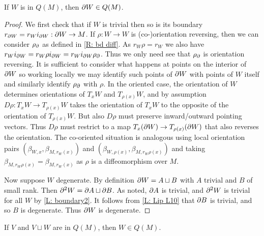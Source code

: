 \begin{lemma}\label{L: bd defined}
If $W$ is in $Q(M)$, then $\partial W \in Q(M)$.
\end{lemma}
\begin{proof}
We first check that if $W$ is trivial then so is its boundary $r_{\partial W} = r_Wi_{\partial W}:\partial W \to M$. If $\rho:W \to W$ is (co-)orientation reversing, then we can consider $\rho_\partial$ as defined in \cref{R: bd diff}. As $r_W\rho = r_W$ we also have $r_Wi_{\partial W} = r_W\rho i_{\partial W} = r_W i_{\partial W} \rho_\partial$. Thus we only need see that $\rho_\partial$ is orientation reversing. It is sufficient to consider what happens at points on the interior of $\partial W$ so working locally we may identify such points of $\partial W$ with points of $W$ itself and similarly identify $\rho_\partial$ with $\rho$. In the oriented case, the orientation of $W$ determines orientations of $T_xW$ and $T_{\rho(x)}W$, and by assumption $D\rho: T_xW \to T_{\rho(x)}W$ takes the orientation of $T_xW$ to the opposite of the orientation of $T_{\rho(x)}W$. But also $D\rho$ must preserve inward/outward pointing vectors. Thus $D\rho$ must restrict to a map $T_x (\partial W) \to T_{\rho(x)}(\partial W)$ that also reverses the orientation. The co-oriented situation is analogous using local orientation pairs $\left(\beta_{W,x}, \beta_{M,r_W(x)}\right)$ and $\left(\beta_{W,\rho(x)}, \beta_{M,r_W\rho(x)}\right)$ and taking $\beta_{M,r_W\rho(x)} = \beta_{M,r_W(x)}$ as $\rho$ is a diffeomorphism over $M$.



Now suppose $W$ degenerate. By definition $\partial W = A\sqcup B$ with $A$ trivial and $B$ of small rank. Then $\partial^2W = \partial A\sqcup \partial B$. As noted, $\partial A$ is trivial, and $\partial^2 W$ is trivial for all $W$ by \cref{L: boundary2}. It follows from \cref{L: Lip L10} that $\partial B$ is trivial, and so $B$ is degenerate. Thus $\partial W$ is degenerate.
\end{proof}


\begin{lemma}\label{L: Lipy12}
If $V$ and $V\sqcup W$ are in $Q(M)$, then $W \in Q(M)$.
\end{lemma}

